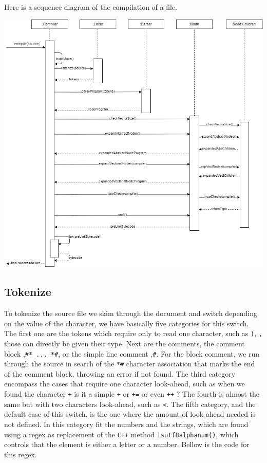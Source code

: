 \documentclass{scrbook}
\begin{document}
Here is a sequence diagram of the compilation of a file.

\begin{center}
  \includegraphics[width=\textwidth]{./compiler_sequence_diagram}
\end{center}

\subsection{Tokenize}

To tokenize the source file we skim through the document and switch depending on the value of the character, we have basically five categories for this switch.
The first one are the tokens which require only to read one character, such as \texttt{)}, \texttt{,} those can directly be given their type. Next are the comments, the comment block ,\texttt{\#* ... *\#}, or the simple line comment ,\texttt{\#}. For the block comment,
we run through the source in search of the \texttt{*\#} character association that marks the end of the comment block, throwing an error if not found. The third category encompass the cases that require one character look-ahead, such as when we found
the character \texttt{+} is it a simple \texttt{+} or \texttt{+=} or even \texttt{++} ? The fourth is almost the same but with two characters look-ahead, such as \texttt{<}. The fifth category, and the default case of this switch, is the one where the amount of look-ahead needed is not defined.
In this category fit the numbers and the strings, which are found using a regex as replacement of the \texttt{C++} method \texttt{is\textunderscore utf8\textunderscore alpha\textunderscore num()}, which controls that the element is either a letter or a number. Bellow is 
the code for this regex.
\end{document}
